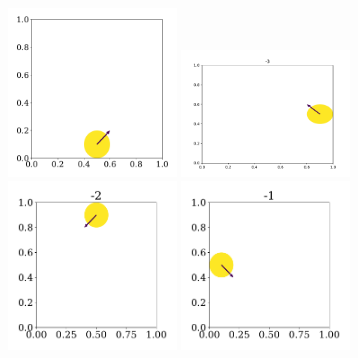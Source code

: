 \documentclass{article}
\begin{document}
        \begin{figure}
            \begin{subfigure}{.35\textwidth}
                \includegraphics[width=0.49\textwidth]{../plots/test_case_one_particle/particle-4.pdf}
                \includegraphics[width=0.49\textwidth]{../plots/test_case_one_particle/particle-3.pdf}
                \includegraphics[width=0.49\textwidth]{../plots/test_case_one_particle/particle-2.pdf}
                \includegraphics[width=0.49\textwidth]{../plots/test_case_one_particle/particle-1.pdf}

\end{subfigure}
\end{figure}
\end{document}
